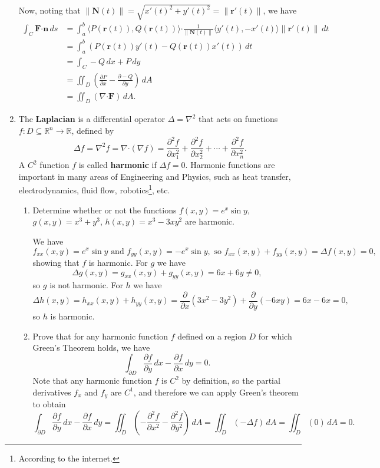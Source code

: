 \documentclass[letterpaper,12pt]{article}
\newcommand{\R}{\mathbb{R}}
\newcommand{\F}{\mathbf{F}}
\newcommand{\dotp}{\boldsymbol{\cdot}}
\renewcommand{\r}{\mathbf{r}}
\newcommand{\n}{\mathbf{n}}
\newcommand{\N}{\mathbf{N}}
\newcommand{\len}[1]{\lVert #1\rVert}
\begin{document}
\begin{enumerate}
Now, noting that $\len{\N(t)} = \sqrt{x'(t)^2+y'(t)^2} = \len{\r'(t)}$, we have
\begin{align*}
 \int_C \F\dotp\n\,ds &= \int_a^b \langle P(\r(t)),Q(\r(t))\rangle\dotp \frac{1}{\len{\N(t)}}\langle y'(t),-x'(t)\rangle \len{\r'(t)}\,dt\\
& = \int_a^b (P(\r(t))y'(t)-Q(\r(t))x'(t))\,dt \\
& = \int_C -Q\,dx+P\,dy\\
& = \iint_D \left(\frac{\partial P}{\partial x}-\frac{\partial -Q}{\partial y}\right)\,dA\\
& = \iint_D (\nabla \dotp\F)\,dA.
\end{align*}


\item The \textbf{Laplacian}  is a differential operator $\Delta = \nabla^2$ that acts on functions $f:D\subseteq \R^n\to \R$, defined by
\[
 \Delta f = \nabla^2f = \nabla\dotp(\nabla f) = \frac{\partial^2 f}{\partial x_1^2}+\frac{\partial^2 f}{\partial x_2^2}+\cdots + \frac{\partial^2 f}{\partial x_n^2}.
\]
A $C^2$ function $f$ is called \textbf{harmonic} if $\Delta f = 0$. Harmonic functions are important in many areas of Engineering and Physics, such as heat transfer, electrodynamics, fluid flow, robotics\footnote{According to the internet.}, etc.
\begin{enumerate}
 \item Determine whether or not the functions $f(x,y)=e^x\sin y$, $g(x,y) = x^3+y^3$, $h(x,y) = x^3-3xy^2$ are harmonic.

\bigskip

We have 
\[
 f_{xx}(x,y)=e^x\sin y \text{ and } f_{yy}(x,y) = -e^x\sin y, \text{ so } f_{xx}(x,y)+f_{yy}(x,y) = \Delta f(x,y) = 0,
\]
showing that $f$ is harmonic. For $g$ we have
\[
 \Delta g(x,y) = g_{xx}(x,y) +g_{yy}(x,y)= 6x+6y\neq 0,
\]
so $g$ is not harmonic. For $h$ we have
\[
 \Delta h(x,y) = h_{xx}(x,y)+h_{yy}(x,y) = \frac{\partial}{\partial x}(3x^2-3y^2)+\frac{\partial}{\partial y}(-6xy) = 6x-6x=0,
\]
so $h$ is harmonic.

 \item Prove that for any harmonic function $f$ defined on a region $D$ for which Green's Theorem holds, we have
\[
 \int_{\partial D}\frac{\partial f}{\partial y}\,dx - \frac{\partial f}{\partial x}\,dy = 0.
\]
Note that any harmonic function $f$ is $C^2$ by definition, so the partial derivatives $f_x$ and $f_y$ are $C^1$, and therefore we can apply Green's theorem to obtain
\[
 \int_{\partial D}\frac{\partial f}{\partial y}\,dx - \frac{\partial f}{\partial x}\,dy = \iint_D\left(-\frac{\partial^2 f}{\partial x^2}-\frac{\partial^2 f}{\partial y^2}\right)\,dA = \iint_D(-\Delta f)\,dA = \iint_D(0)\,dA = 0.
\]

 \end{enumerate}

\end{enumerate}
\end{document}
